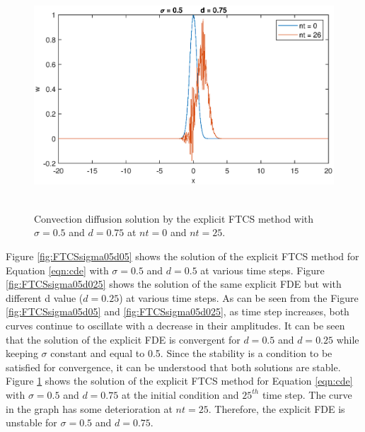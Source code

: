 \documentclass[letterpaper,12pt]{article}
\begin{document}
\newpage
\begin{figure}[!ht] 
	\centering 
	\includegraphics[max height=8.5cm]{graphs/FTCS/ConvectionDiffusion/sigma05d075.eps}
	\caption{Convection diffusion solution by the explicit FTCS method with $\sigma= 0.5$ and $d=0.75$ at $nt=0$ and $nt=25$.}
	 \label{fig:FTCSsigma05d075}
\end{figure}
Figure \ref{fig:FTCSsigma05d05} shows the solution of the explicit FTCS
method for Equation \ref{eqn:cde} with $\sigma= 0.5$ and $d=0.5$ at various time steps.
Figure \ref{fig:FTCSsigma05d025} shows the solution of the same explicit FDE but with 
different d value ($d=0.25$) at various time steps. As can be seen from the Figure \ref{fig:FTCSsigma05d05}
and \ref{fig:FTCSsigma05d025}, as time step increases, both curves continue to oscillate with a decrease in their
amplitudes. It can be seen that the solution of the explicit FDE is convergent for $d=0.5$
and $d=0.25$ while keeping $\sigma$ constant and equal to 0.5. Since the stability is a condition
to be satisfied for convergence, it can be understood that both solutions are stable. \\
\indent Figure \ref{fig:FTCSsigma05d075} shows the solution of the explicit FTCS
method for Equation \ref{eqn:cde} with $\sigma= 0.5$ and $d=0.75$ at the initial condition
and $25^{th}$ time step. The curve in the graph has some deterioration at $nt = 25$. Therefore,
the explicit FDE is unstable for $\sigma= 0.5$ and $d=0.75$.
\newpage
\end{document}
